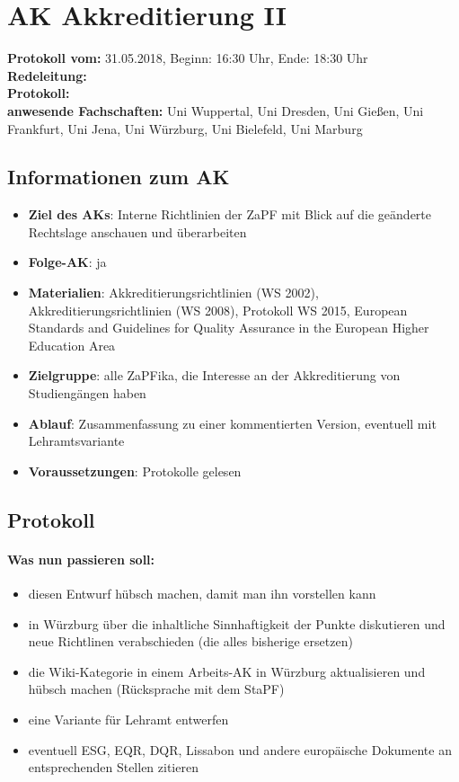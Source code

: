 
\section{AK Akkreditierung II}

  \textbf{Protokoll vom:} 31.05.2018, %
  Beginn: 16:30 Uhr, %
  Ende: 18:30 Uhr \\ %
  \textbf{Redeleitung:} \\ %
  \textbf{Protokoll:} \\ %
  \textbf{anwesende Fachschaften:} Uni Wuppertal, Uni Dresden, Uni Gießen, Uni Frankfurt, Uni Jena, Uni Würzburg, Uni Bielefeld, Uni Marburg

  \subsection*{Informationen zum AK}
    \begin{itemize}
    	\item \textbf{Ziel des AKs}: Interne Richtlinien der ZaPF mit Blick auf die geänderte Rechtslage anschauen und überarbeiten
    	\item \textbf{Folge-AK}: ja
      \item \textbf{Materialien}: Akkreditierungsrichtlinien (WS 2002), Akkreditierungsrichtlinien (WS 2008), Protokoll WS 2015, European Standards and Guidelines for Quality Assurance in the European Higher Education Area
    	\item \textbf{Zielgruppe}: alle ZaPFika, die Interesse an der Akkreditierung von Studiengängen haben
    	\item \textbf{Ablauf}: Zusammenfassung zu einer kommentierten Version, eventuell mit Lehramtsvariante
    	\item \textbf{Voraussetzungen}: Protokolle gelesen
    \end{itemize}

  \subsection*{Protokoll}
    \paragraph{Was nun passieren soll:}
      \begin{itemize}
        \item diesen Entwurf hübsch machen, damit man ihn vorstellen kann
        \item in Würzburg über die inhaltliche Sinnhaftigkeit der Punkte diskutieren und neue Richtlinen verabschieden (die alles bisherige ersetzen)
        \item die Wiki-Kategorie in einem Arbeits-AK in Würzburg aktualisieren und hübsch machen (Rücksprache mit dem StaPF)
        \item eine Variante für Lehramt entwerfen
        \item eventuell ESG, EQR, DQR, Lissabon und andere europäische Dokumente an entsprechenden Stellen zitieren
      \end{itemize}

